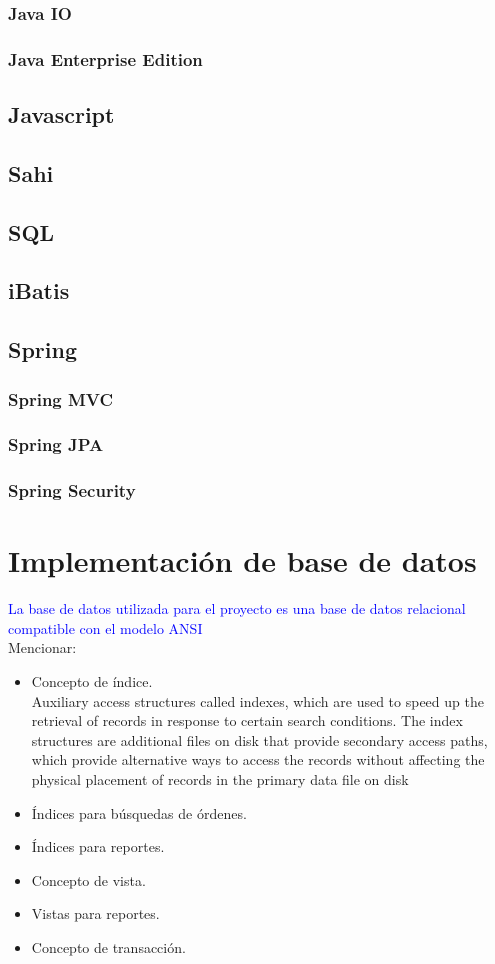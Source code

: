 \subsubsection{Java IO}
\subsubsection{Java Enterprise Edition}
\subsection{Javascript}
\subsection{Sahi}
\subsection{SQL}
\subsection{iBatis}
\subsection{Spring}
\subsubsection{Spring MVC}
\subsubsection{Spring JPA}
\subsubsection{Spring Security}


\section{Implementación de base de datos}
\textcolor{blue}{La base de datos utilizada para el proyecto es una base de datos relacional compatible con el modelo ANSI}\\
Mencionar: 
\begin{itemize}
	\item Concepto de índice.\\
	Auxiliary access structures called indexes, which are used to speed up the retrieval of records in response to certain search conditions. The index structures are additional files on disk that provide secondary access paths, which provide alternative ways to access the records without affecting the physical placement of records in the primary data file on disk
	\cite{FundamentalsOfDBSystems}



	\item Índices para búsquedas de órdenes.
	\item Índices para reportes.
	\item Concepto de vista.
	\item Vistas para reportes.
	\item Concepto de transacción.
\end{itemize}

